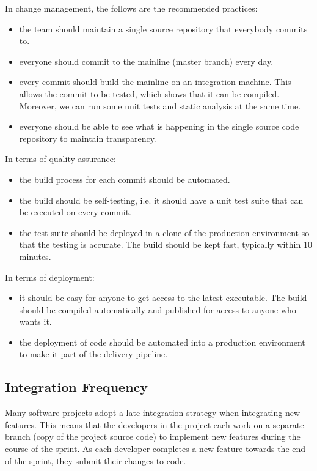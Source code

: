\documentclass[a4paper, openany]{memoir}
\begin{document}
In change management, the follows are the recommended practices:
\begin{itemize}
    \item the team should maintain a single source repository that everybody commits to.
    \item everyone should commit to the mainline (master branch) every day.
    \item every commit should build the mainline on an integration machine. This allows the commit to be tested, which shows that it can be compiled. Moreover, we can run some unit tests and static analysis at the same time.
    \item everyone should be able to see what is happening in the single source code repository to maintain transparency.
\end{itemize}
In terms of quality assurance:
\begin{itemize}
    \item the build process for each commit should be automated.
    \item the build should be self-testing, i.e. it should have a unit test suite that can be executed on every commit.
    \item the test suite should be deployed in a clone of the production environment so that the testing is accurate. The build should be kept fast, typically within 10 minutes.
\end{itemize}
In terms of deployment:
\begin{itemize}
    \item it should be easy for anyone to get access to the latest executable. The build should be compiled automatically and published for access to anyone who wants it.
    \item the deployment of code should be automated into a production environment to make it part of the delivery pipeline.
\end{itemize}

\subsection{Integration Frequency}
Many software projects adopt a late integration strategy when integrating new features. This means that the developers in the project each work on a separate branch (copy of the project source code) to implement new features during the course of the sprint. As each developer completes a new feature towards the end of the sprint, they submit their changes to code.
\end{document}
